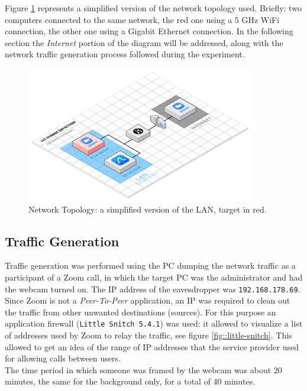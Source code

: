 \documentclass{article}
\begin{document}
Figure \ref{fig::net-topology} represents a simplified version of the network topology used. Briefly: two computers connected to the same network, the red one using a 5 GHz WiFi connection, the other one using a Gigabit Ethernet connection. In the following section the \textit{Internet} portion of the diagram will be addressed, along with the network traffic generation process followed during the experiment.

\begin{figure}[h]
	\centering
	\includegraphics[width=10cm]{assets/Spy-Your-Mate-Topology.png}
	\caption{Network Topology: a simplified version of the LAN, target in red.}
	\label{fig::net-topology}
\end{figure}

\subsection[]{Traffic Generation}

Traffic generation was performed using the PC dumping the network traffic as a participant of a Zoom call, in which the target PC was the administrator and had the webcam turned on. The IP address of the eavesdropper was \texttt{192.168.178.69}. Since Zoom is not a \textit{Peer-To-Peer} application, an IP was required to clean out the traffic from other unwanted destinations (sources). For this purpose an application firewall (\texttt{Little Snitch 5.4.1}) was used: it allowed to visualize a list of addresses used by Zoom to relay the traffic, see figure \ref{fig::little-snitch}. This allowed to get an idea of the range of IP addresses that the service provider used for allowing calls between users. \\ The time period in which someone was framed by the webcam was about 20 minutes, the same for the background only, for a total of 40 minutes.
\end{document}
